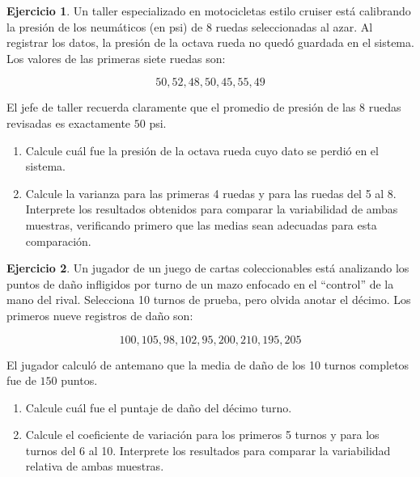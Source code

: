 \documentclass[
  11pt,
]{book}
\providecommand{\tightlist}{%
  \setlength{\itemsep}{0pt}\setlength{\parskip}{0pt}}
\theoremstyle{definition}
\theoremstyle{definition}
\theoremstyle{definition}
\newtheorem{exercise}{Ejercicio}[chapter]
\theoremstyle{definition}
\theoremstyle{remark}
\begin{document}
\begin{exercise}

Un taller especializado en motocicletas estilo cruiser está calibrando la presión de los neumáticos (en psi) de 8 ruedas seleccionadas al azar. Al registrar los datos, la presión de la octava rueda no quedó guardada en el sistema. Los valores de las primeras siete ruedas son:

\[50, 52, 48, 50, 45, 55, 49\]

El jefe de taller recuerda claramente que el promedio de presión de las 8 ruedas revisadas es exactamente \(50\) psi.

\begin{enumerate}
\def\labelenumi{\arabic{enumi}.}
\tightlist
\item
  Calcule cuál fue la presión de la octava rueda cuyo dato se perdió en el sistema.
\item
  Calcule la varianza para las primeras 4 ruedas y para las ruedas del 5 al 8. Interprete los resultados obtenidos para comparar la variabilidad de ambas muestras, verificando primero que las medias sean adecuadas para esta comparación.
\end{enumerate}

\end{exercise}

\begin{exercise}

Un jugador de un juego de cartas coleccionables está analizando los puntos de daño infligidos por turno de un mazo enfocado en el ``control'' de la mano del rival. Selecciona 10 turnos de prueba, pero olvida anotar el décimo. Los primeros nueve registros de daño son:

\[100, 105, 98, 102, 95, 200, 210, 195, 205\]

El jugador calculó de antemano que la media de daño de los 10 turnos completos fue de \(150\) puntos.

\begin{enumerate}
\def\labelenumi{\arabic{enumi}.}
\tightlist
\item
  Calcule cuál fue el puntaje de daño del décimo turno.
\item
  Calcule el coeficiente de variación para los primeros 5 turnos y para los turnos del 6 al 10. Interprete los resultados para comparar la variabilidad relativa de ambas muestras.
\end{enumerate}

\end{exercise}
\end{document}
